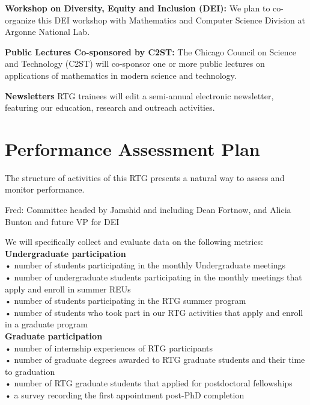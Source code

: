 \documentclass[11pt]{NSFamsart}
\newcommand{\FredNote}[1]{{\color{blue} Fred: #1}}
\begin{document}
\noindent
\textbf{Workshop on Diversity, Equity and Inclusion (DEI):}
We plan to co-organize this DEI workshop with Mathematics and Computer Science Division at   Argonne National Lab. 

\noindent
\textbf{Public Lectures Co-sponsored by  C2ST:}  The Chicago Council on Science and Technology (C2ST) will co-sponsor   one or more public lectures on applications   of mathematics in modern science and technology.

\noindent
\textbf{Newsletters} 
RTG trainees will edit a semi-annual electronic newsletter, 
featuring our education, research  and outreach  activities. 



\section{Performance Assessment Plan  }
 
The structure  of activities of this RTG presents a natural way to assess and monitor performance.  

\FredNote{Committee headed by Jamshid and including Dean Fortnow, and Alicia Bunton and future VP for DEI }


We will specifically collect and evaluate data on the following metrics:\\

\noindent
\textbf{Undergraduate participation}\\
• number of students participating in the monthly Undergraduate meetings\\
• number of undergraduate students participating in the monthly meetings that apply and enroll in summer REUs\\
• number of students participating in the RTG summer  program\\
• number of students who took part in our RTG activities that apply and enroll in a graduate program\\

\noindent
\textbf{Graduate participation}\\
• number of internship experiences of RTG participants\\
• number of graduate degrees awarded to RTG graduate students and their time to graduation\\
• number of RTG graduate students that applied for postdoctoral fellowships\\
• a survey recording the first appointment post-PhD completion\\
\end{document}
